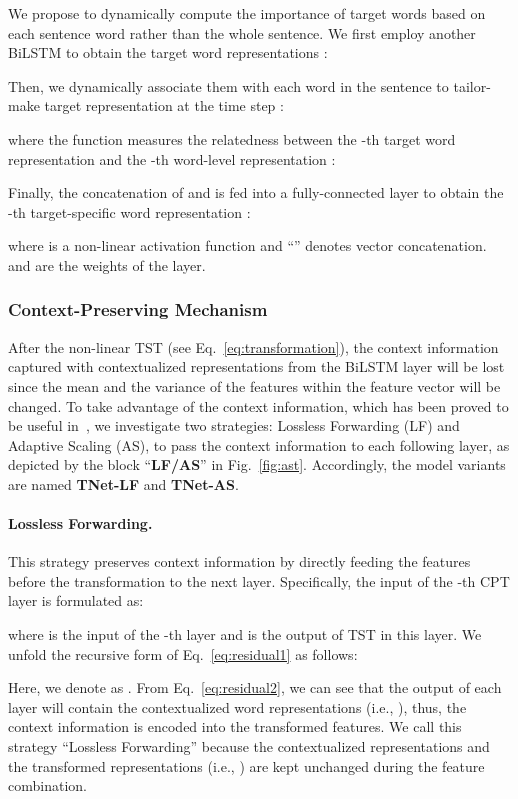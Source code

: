 \documentclass[11pt,a4paper]{article}
\begin{document}
We propose to dynamically compute the importance of target words based on each sentence word rather than the whole sentence. We first employ another BiLSTM to obtain the target word representations :

Then, we dynamically associate them with each word  in the sentence to tailor-make target representation  at the time step :

where the function  measures the relatedness between the -th target word representation  and the -th word-level representation :

Finally, the concatenation of  and  is fed into a fully-connected layer to obtain the -th target-specific word representation :

where  is a non-linear activation function and ``'' denotes vector concatenation.  and  are the weights of the layer.
\subsubsection{Context-Preserving Mechanism}
After the non-linear TST (see Eq.~\ref{eq:transformation}), the context information captured with contextualized representations from the BiLSTM layer
will be lost since the mean and the variance of the features within the feature vector will be changed. To take advantage of the context information, which has been proved to be useful in~\cite{lai2015recurrent}, we investigate two strategies: Lossless Forwarding (LF) and Adaptive Scaling (AS), to pass the context information to each following layer, as depicted by the block ``\textbf{LF/AS}'' in Fig.~\ref{fig:ast}. Accordingly, the model variants are named \textbf{TNet-LF} and \textbf{TNet-AS}.

\paragraph{Lossless Forwarding.}
This strategy preserves context information by directly feeding the features before the transformation to the next layer. Specifically, the input  of the -th CPT layer is formulated as:

where  is the input of the -th layer and  is the output of TST in this layer. We unfold the recursive form of Eq.~\ref{eq:residual1} as follows:

Here, we denote  as . From Eq.~\ref{eq:residual2}, we can see that the output of each layer will contain the contextualized word representations (i.e., ), thus, the context information is encoded into the transformed features. We call this strategy ``Lossless Forwarding'' because the contextualized representations and the transformed representations (i.e., ) are kept unchanged during the feature combination.
\end{document}
